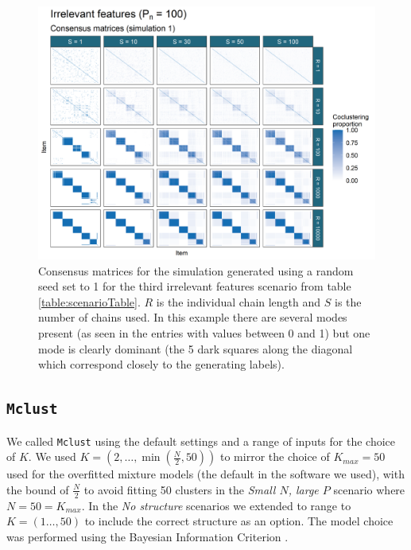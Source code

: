 \documentclass[]{article}
\begin{document}
\begin{figure} %
	\centering
	\includegraphics[scale=0.65]{./Images/Simulations/CMs/irrelevant_features_100Sim1.png}
	\caption{Consensus matrices for the simulation generated using a random seed set to 1 for the third irrelevant features scenario from table \ref{table:scenarioTable}. $R$ is the individual chain length and $S$ is the number of chains used. In this example there are several modes present (as seen in the entries with values between 0 and 1) but one mode is clearly dominant (the 5 dark  squares along the diagonal which correspond closely to the generating labels).}
	\label{fig:simCMsIrr100}
\end{figure}


\subsection{\texttt{Mclust}}
We called \texttt{Mclust} using the default settings and a range of inputs for the choice of $K$. We used $K = (2, \ldots, \min(\frac{N}{2}, 50))$ to mirror the choice of $K_{max}=50$ used for the overfitted mixture models (the default in the software we used), with the bound of $\frac{N}{2}$ to avoid fitting 50 clusters in the \emph{Small $N$, large $P$} scenario where $N=50=K_{max}$. In the \emph{No structure} scenarios we extended to range to $K = (1 \ldots, 50)$ to include the correct structure as an option. The model choice was performed using the Bayesian Information Criterion \citep[][as implemented in \texttt{Mclust}]{schwarz1978estimating}.

\end{document}
